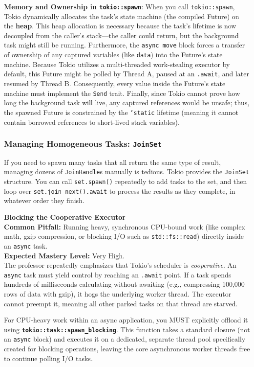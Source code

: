 \begin{memoryblock}
\textbf{Memory and Ownership in \texttt{tokio::spawn}}:
When you call \texttt{tokio::spawn}, Tokio dynamically allocates the task's state machine (the compiled Future) on the \textbf{heap}. This heap allocation is necessary because the task's lifetime is now decoupled from the caller's stack---the caller could return, but the background task might still be running.
Furthermore, the \texttt{async move} block forces a transfer of ownership of any captured variables (like \texttt{data}) into the Future's state machine. Because Tokio utilizes a multi-threaded work-stealing executor by default, this Future might be polled by Thread A, paused at an \texttt{.await}, and later resumed by Thread B. Consequently, every value inside the Future's state machine must implement the \texttt{Send} trait. Finally, since Tokio cannot prove how long the background task will live, any captured references would be unsafe; thus, the spawned Future is constrained by the \texttt{'static} lifetime (meaning it cannot contain borrowed references to short-lived stack variables).
\end{memoryblock}

\subsubsection{Managing Homogeneous Tasks: \texttt{JoinSet}}
If you need to spawn many tasks that all return the same type of result, managing dozens of \texttt{JoinHandle}s manually is tedious. Tokio provides the \texttt{JoinSet} structure. You can call \texttt{set.spawn()} repeatedly to add tasks to the set, and then loop over \texttt{set.join\_next().await} to process the results as they complete, in whatever order they finish.

\begin{examprioritybox}
\textbf{Blocking the Cooperative Executor} \\
\textbf{Common Pitfall:} Running heavy, synchronous CPU-bound work (like complex math, gzip compression, or blocking I/O such as \texttt{std::fs::read}) directly inside an \texttt{async} task. \\
\textbf{Expected Mastery Level:} Very High. \\
The professor repeatedly emphasizes that Tokio's scheduler is \textit{cooperative}. An \texttt{async} task must yield control by reaching an \texttt{.await} point. If a task spends hundreds of milliseconds calculating without awaiting (e.g., compressing 100,000 rows of data with gzip), it hogs the underlying worker thread. The executor cannot preempt it, meaning all other parked tasks on that thread are starved. 

For CPU-heavy work within an async application, you MUST explicitly offload it using \textbf{\texttt{tokio::task::spawn\_blocking}}. This function takes a standard closure (not an \texttt{async} block) and executes it on a dedicated, separate thread pool specifically created for blocking operations, leaving the core asynchronous worker threads free to continue polling I/O tasks.
\end{examprioritybox}

